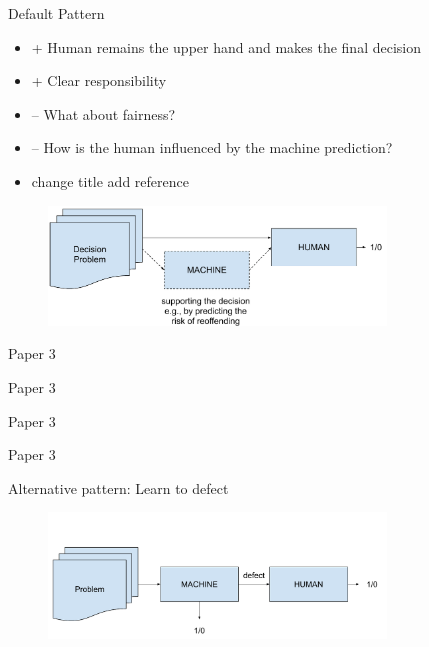 \documentclass[11pt]{beamer}
\newcommand{\TODO}[1]{{\color{red}#1}}
\begin{document}
\begin{frame}{Default Pattern}
\begin{itemize}
\setlength\itemsep{5pt}%

\item + Human remains the upper hand and makes the final decision
\item + Clear responsibility

\item -- What about fairness?
\item -- How is the human influenced by the machine prediction?
\item \TODO{change title add reference}
\end{itemize}

\begin{figure}[t!]
    \centering
        \includegraphics[width=0.8\textwidth]{Figures/human_decision.pdf}
\end{figure}
\end{frame}


\begin{frame}{Paper 3}
\end{frame}

\begin{frame}{Paper 3}
\end{frame}


\begin{frame}{Paper 3}
\end{frame}


\begin{frame}{Paper 3}
\end{frame}


\begin{frame}{Alternative pattern: Learn to defect}

\begin{figure}[t!]
	\centering
	\includegraphics[width=0.8\textwidth]{Figures/defect.pdf}
\end{figure}
\end{frame}
\end{document}
